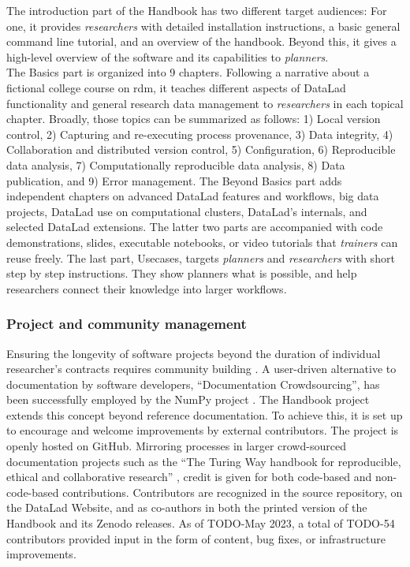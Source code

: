 The introduction part of the Handbook has two different target audiences:
For one, it provides \textit{researchers} with detailed installation instructions, a basic general command line tutorial, and an overview of the handbook.
Beyond this, it gives a high-level overview of the software and its capabilities to \textit{planners}. \\
The Basics part is organized into 9 chapters.
Following a narrative about a fictional college course on \gls{rdm}, it teaches different aspects of DataLad functionality and general research data management to \textit{researchers} in each topical chapter.
Broadly, those topics can be summarized as follows: 1) Local version control, 2) Capturing and re-executing process provenance, 3) Data integrity, 4) Collaboration and distributed version control, 5) Configuration, 6) Reproducible data analysis, 7) Computationally reproducible data analysis, 8) Data publication, and 9) Error management.
The Beyond Basics part adds independent chapters on advanced DataLad features and workflows, big data projects, DataLad use on computational clusters, DataLad's internals, and selected DataLad extensions.
The latter two parts are accompanied with code demonstrations, slides, executable notebooks, or video tutorials that \textit{trainers} can reuse freely.
The last part, Usecases, targets \textit{planners} and \textit{researchers} with short step by step instructions.
They show planners what is possible, and help researchers connect their knowledge into larger workflows.

\subsubsection{Project and community management}

Ensuring the longevity of software projects beyond the duration of individual researcher's contracts requires community building \citep{koehler2020better}.
A user-driven alternative to documentation by software developers, ``Documentation Crowdsourcing'', has been successfully employed by the NumPy project \citep{pawlik2014crowdsourcing}.
The Handbook project extends this concept beyond reference documentation.
To achieve this, it is set up to encourage and welcome improvements by external contributors.
The project is openly hosted on GitHub.
Mirroring processes in larger crowd-sourced documentation projects such as the ``The Turing Way handbook for reproducible, ethical and collaborative research'' \citep{the_turing_way_community_2022_7625728}, credit is given for both code-based and non-code-based contributions.
Contributors are recognized in the source repository, on the DataLad Website, and as co-authors in both the printed version of the Handbook and its Zenodo releases.
As of TODO-May 2023, a total of TODO-54 contributors provided input in the form of content, bug fixes, or infrastructure improvements.


